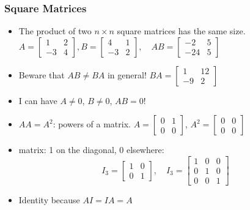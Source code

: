 \documentclass[8pt]{beamer}
\newcommand{\myemph}[1]{{\color{blue}{#1}}}
\begin{document}
\begin{frame}
  \frametitle{Square Matrices}
  \begin{itemize}
  \item The product of two $n\times n$ square matrices has the same size.
    $A= 
    \begin{bmatrix}
      1 & 2\\ -3 & 4
    \end{bmatrix}, B = 
    \begin{bmatrix}
      4 & 1\\
      -3 & 2
    \end{bmatrix}, \quad
    A B= 
    \begin{bmatrix}
      -2 & 5\\ -24& 5
    \end{bmatrix}
    $
  \item Beware that $A B \not = B A$ in general! $B A =
    \begin{bmatrix}
      1 & 12\\ -9 & 2
    \end{bmatrix}
    $
  \item I can have $A\not= 0$, $B\not = 0$, $AB = 0$!
  \item $AA = A^2$: powers of a matrix. $A =
    \begin{bmatrix}
      0 & 1\\
      0 & 0
    \end{bmatrix} 
    $, $A^2 =
    \begin{bmatrix}
      0 & 0\\ 0 & 0
    \end{bmatrix}
    $
  \item \myemph{Identity} matrix: 1 on the diagonal, 0 elsewhere: 
    $$
    I_3 =
    \begin{bmatrix}
      1 & 0\\
      0 & 1
    \end{bmatrix},\quad
    I_3 =
    \begin{bmatrix}
      1 & 0 & 0\\
      0 & 1  & 0\\
      0 & 0 & 1
    \end{bmatrix}
    $$
  \item Identity because $A I = I A = A$

  \end{itemize}
\end{frame}
\end{document}
